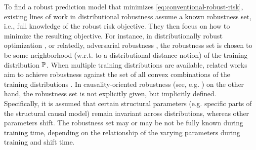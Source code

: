 To find a robust prediction model that minimizes \eqref{eq:conventional-robust-risk}, existing lines of work in distributional robustness assume a known robustness set, i.e., full knowledge of the robust risk objective. They then focus on how to minimize the resulting objective. For instance, in distributionally robust optimization \citep{bental2013robust, duchi2021learning}, or relatedly, adversarial robustness  \citep{goodfellow2014explaining, madry2018towards}, the robustness set is chosen to be some neighborhood (w.r.t. to a distributional distance notion) of the training distribution $\mathbb{P}$. When multiple training distributions are available, related works aim to achieve robustness against the set of all convex combinations of the training distributions \citep{mansour2008, meinshausen2014, sagawa2019distributionally}.  
In causality-oriented robustness  (see, e.g. \citep{buhlmann2020invariance,meinshausen2018causality,shen2023causalityoriented}) on the other hand, the robustness set is not explicitly given, but implicitly defined. Specifically, it is assumed that certain structural parameters (e.g. specific parts of the structural causal model) %
remain invariant across distributions, whereas other parameters shift. 
The robustness set may or may be not be fully known during training time, depending on the relationship of the varying parameters during training and shift time. 


